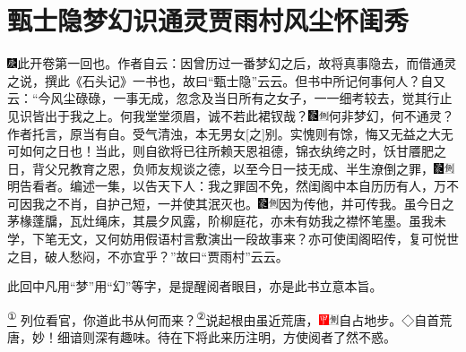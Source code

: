 

\chapter{甄士隐梦幻识通灵\hspace{.5em}贾雨村风尘怀闺秀}

{\includegraphics[width=3mm]{../Images/00004}\kaishu 此开卷第一回也。作者自云：因曾历过一番梦幻之后，故将真事隐去，而借通灵之说，撰此《石头记》一书也，故曰``甄士隐''云云。但书中所记何事何人？自又云：``今风尘碌碌，一事无成，忽念及当日所有之女子，一一细考较去，觉其行止见识皆出于我之上。何我堂堂须眉，诚不若此裙钗哉？{\includegraphics[width=3mm]{../Images/00006}\includegraphics[width=3mm]{../Images/00011}\footnotesize \kaishu 何非梦幻，何不通灵？作者托言，原当有自。受气清浊，本无男女{[}之{]}别。}实愧则有馀，悔又无益之大无可如何之日也！当此，则自欲将已往所赖天恩祖德，锦衣纨绔之时，饫甘餍肥之日，背父兄教育之恩，负师友规谈之德，以至今日一技无成、半生潦倒之罪，{\includegraphics[width=3mm]{../Images/00006}\includegraphics[width=3mm]{../Images/00011}\footnotesize \kaishu 明告看者。}编述一集，以告天下人：我之罪固不免，然闺阁中本自历历有人，万不可因我之不肖，自护己短，一并使其泯灭也。{\includegraphics[width=3mm]{../Images/00006}\includegraphics[width=3mm]{../Images/00011}\footnotesize \kaishu 因为传他，并可传我。}虽今日之茅椽蓬牖，瓦灶绳床，其晨夕风露，阶柳庭花，亦未有妨我之襟怀笔墨。虽我未学，下笔无文，又何妨用假语村言敷演出一段故事来？亦可使闺阁昭传，复可悦世之目，破人愁闷，不亦宜乎？''故曰``贾雨村''云云。

此回中凡用``梦''用``幻''等字，是提醒阅者眼目，亦是此书立意本旨。}\href{../Text/part0005_split_000.html\#lnkback_1_a}{\textsuperscript{①}}
\yahei 列位看官，你道此书从何而来？\href{../Text/part0005_split_000.html\#lnkback_2_a}{\textsuperscript{②}}说起根由虽近荒唐，{\includegraphics[width=3mm]{../Images/00002}\includegraphics[width=3mm]{../Images/00011}\footnotesize \kaishu 自占地步。◇自首荒唐，妙！}细谙则深有趣味。待在下将此来历注明，方使阅者了然不惑。

